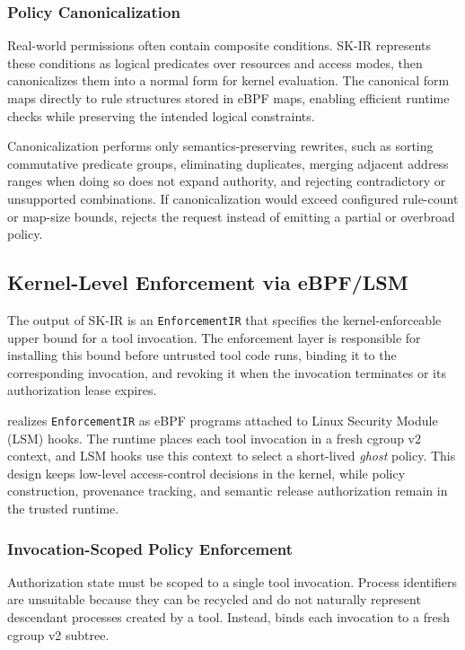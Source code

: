 \subsubsection{Policy Canonicalization}
\label{sec:design:ir:normalize}

Real-world permissions often contain composite conditions. SK-IR represents
these conditions as logical predicates over resources and access modes, then
canonicalizes them into a normal form for kernel evaluation. The canonical form
maps directly to rule structures stored in eBPF maps, enabling efficient
runtime checks while preserving the intended logical constraints.

Canonicalization performs only semantics-preserving rewrites, such as sorting
commutative predicate groups, eliminating duplicates, merging adjacent address
ranges when doing so does not expand authority, and rejecting contradictory or
unsupported combinations. If canonicalization would exceed configured rule-count
or map-size bounds, \SystemName rejects the request instead of emitting a
partial or overbroad policy.

\subsection{Kernel-Level Enforcement via eBPF/LSM}
\label{sec:design:ebpf}

The output of SK-IR is an \texttt{EnforcementIR} that specifies the
kernel-enforceable upper bound for a tool invocation. The enforcement layer is
responsible for installing this bound before untrusted tool code runs, binding
it to the corresponding invocation, and revoking it when the invocation
terminates or its authorization lease expires.

\SystemName realizes \texttt{EnforcementIR} as eBPF programs attached to Linux
Security Module (LSM) hooks. The runtime places each tool invocation in a fresh
cgroup v2 context, and LSM hooks use this context to select a short-lived
\emph{ghost} policy. This design keeps low-level access-control decisions in
the kernel, while policy construction, provenance tracking, and semantic
release authorization remain in the trusted runtime.

\subsubsection{Invocation-Scoped Policy Enforcement}
\label{sec:design:ebpf:cgroup}

Authorization state must be scoped to a single tool invocation. Process
identifiers are unsuitable because they can be recycled and do not naturally
represent descendant processes created by a tool. Instead, \SystemName binds
each invocation to a fresh cgroup v2 subtree.

